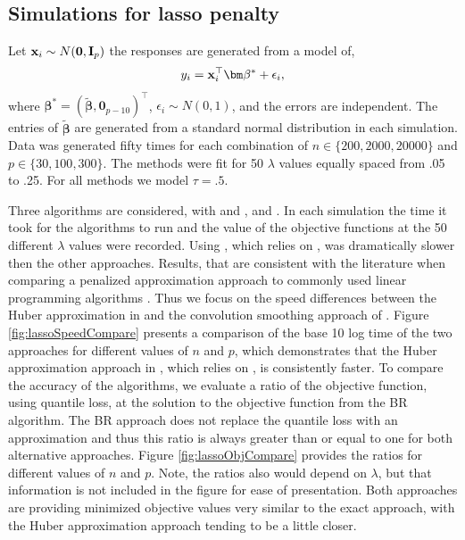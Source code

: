\subsection{Simulations for lasso penalty}\label{simulations-for-lasso-penalty}

Let \({\bf x}_i \sim N({\bf 0}, {\bf I}_p)\) the responses are generated from a model of,\\
\begin{equation}
y_i = {\bf x}_i^\top \bm \beta^* + \epsilon_i,
\label{eq:dgp}
\end{equation}
where \(\bm \beta^*=(\tilde{\bm \beta},\mathbf{0}_{p-10})^\top\), \(\epsilon_i \sim N(0,1)\), and the errors are independent. The entries of \(\tilde{\bm \beta}\) are generated from a standard normal distribution in each simulation. Data was generated fifty times for each combination of \(n \in \{200,2000,20000\}\) and \(p \in \{30,100,300\}\). The methods were fit for 50 \(\lambda\) values equally spaced from .05 to .25. For all methods we model \(\tau=.5\).

Three algorithms are considered,  with  and , and . In each simulation the time it took for the algorithms to run and the value of the objective functions at the 50 different \(\lambda\) values were recorded. Using , which relies on , was dramatically slower then the other approaches. Results, that are consistent with the literature when comparing a penalized approximation approach to commonly used linear programming algorithms \citep{huber_cd, highdConv}. Thus we focus on the speed differences between the Huber approximation in  and the convolution smoothing approach of . Figure \ref{fig:lassoSpeedCompare} presents a comparison of the base 10 log time of the two approaches for different values of \(n\) and \(p\), which demonstrates that the Huber approximation approach in , which relies on , is consistently faster. To compare the accuracy of the algorithms, we evaluate a ratio of the objective function, using quantile loss, at the solution to the objective function from the BR algorithm. The BR approach does not replace the quantile loss with an approximation and thus this ratio is always greater than or equal to one for both alternative approaches. Figure \ref{fig:lassoObjCompare} provides the ratios for different values of \(n\) and \(p\). Note, the ratios also would depend on \(\lambda\), but that information is not included in the figure for ease of presentation. Both approaches are providing minimized objective values very similar to the exact approach, with the Huber approximation approach tending to be a little closer.

